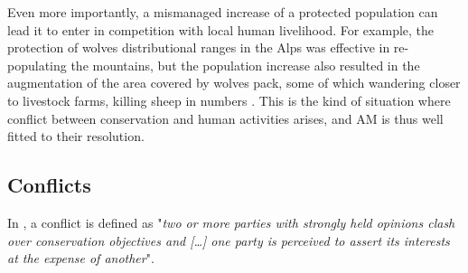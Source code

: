 \documentclass[12pt,a4paper]{article}
\begin{document}
Even more importantly, a mismanaged increase of a protected population can lead it to enter in competition with local human livelihood.
For example, the protection of wolves distributional ranges in the Alps was effective in re-populating the mountains, but the population increase also resulted in the augmentation of the area covered by wolves pack, some of which wandering closer to livestock farms, killing sheep in numbers \citep{behr2017combining}.
This is the kind of situation where conflict between conservation and human activities arises, and AM is thus well fitted to their resolution.

\subsection{Conflicts}

In \cite{redpath2013understanding}, a conflict is defined as "\textit{two or more parties with strongly held opinions clash over conservation objectives and [\dots] one party is perceived to assert its interests at the expense of another}".
\end{document}
